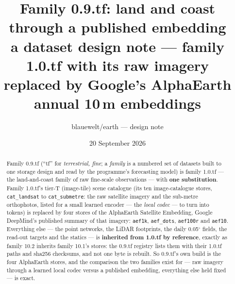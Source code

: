 \documentclass[10pt]{article}
\title{Family 0.9.tf: land and coast through a published embedding\\
\large a dataset design note --- family 1.0.tf with its raw imagery replaced by Google's AlphaEarth annual 10\,m embeddings}
\author{blauewelt/earth --- design note}
\date{20 September 2026}
\newcommand{\code}[1]{\texttt{#1}}
\begin{document}
\maketitle

\begin{abstract}
Family 0.9.tf (``tf'' for \emph{terrestrial, fine}; a \emph{family} is a
numbered set of datasets built to one storage design and read by the
programme's forecasting model) is family 1.0.tf --- the land-and-coast
family of raw fine-scale observations --- with \textbf{one substitution}.
Family 1.0.tf's tier-T (image-tile) scene catalogue (its ten image-catalogue stores,
\code{cat\_landsat} to \code{cat\_submetre}: the raw satellite imagery and
the sub-metre orthophotos, listed for a small learned encoder --- the
\emph{local codec} --- to turn into tokens) is replaced by four stores of
the AlphaEarth Satellite Embedding, Google DeepMind's published summary of
that imagery: \code{aef1k}, \code{aef\_dots}, \code{aef100r} and
\code{aef10}. Everything else --- the point networks, the LiDAR footprints,
the daily 0.05$^\circ$ fields, the read-out targets and the statics --- is
\textbf{inherited from 1.0.tf by reference}, exactly as family 10.2
inherits family 10.1's stores: the 0.9.tf registry lists them with their
1.0.tf paths and sha256 checksums, and not one byte is rebuilt. So
0.9.tf's own build is the four AlphaEarth stores, and the comparison the two
families exist for --- raw imagery through a learned local codec versus a
published embedding, everything else held fixed --- is exact.


\end{abstract}
\end{document}

